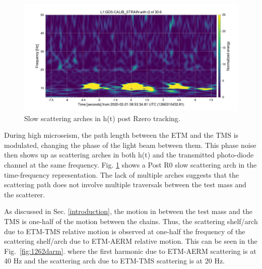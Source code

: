 \documentclass[12pt]{iopart}
\begin{document}
\begin{figure}[h]
    \centering
    \includegraphics[width=\textwidth]{postr0-scatomega.png}
    \caption{Slow scattering arches in h(t) post Rzero tracking. }
    \label{fig:postr0_omeg}
\end{figure}
During high microseism, the path length between the ETM and the TMS is modulated, changing the phase of the light beam between them. This phase noise then shows up as scattering arches in both h(t) and the transmitted photo-diode channel at the same frequency. Fig. \ref{fig:postr0_omeg} shows a Post R0 slow scattering arch in the time-frequency representation. The lack of multiple arches suggests that the scattering  path does not involve multiple traversals between the test mass and the scatterer.

As discussed in Sec. \ref{introduction}, the motion in between the test mass and the TMS is one-half of the motion between the chains.
Thus, the scattering shelf/arch due to ETM-TMS relative motion is observed at one-half the frequency of the scattering shelf/arch due to ETM-AERM relative motion. This can be seen in the Fig.~\ref{fig:1262darm}. where the first harmonic due to ETM-AERM scattering is at 40 Hz and the scattering arch due to ETM-TMS scattering is at 20 Hz.
\end{document}
